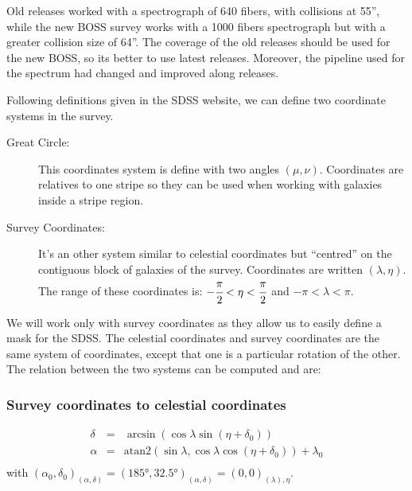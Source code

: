 Old releases worked with a spectrograph of 640 fibers, with collisions at
55'', while the new BOSS survey works with a 1000 fibers spectrograph but
with a greater collision size of 64''. The coverage of the old releases
should be used for the new BOSS, so its better to use latest releases.
Moreover, the pipeline used for the spectrum had changed and improved along
releases.

Following definitions given in the SDSS website, we can define two
coordinate systems in the survey.
%
\begin{description}
    \item[Great Circle:] This coordinates system is define with two angles
        $(\mu, \nu)$. Coordinates are relatives to one stripe so they can be
        used when working with galaxies inside a stripe region.

    \item[Survey Coordinates:] It's an other system similar to celestial
        coordinates but ``centred'' on the contiguous block of galaxies  of
        the survey. Coordinates are written $(\lambda, \eta)$. The range of
        these coordinates is: $-\cfrac{\pi}{2}<\eta<\cfrac{\pi}{2}$ and
        $-\pi<\lambda<\pi$.
\end{description}
%
We will work only with survey coordinates as they allow us to easily define
a mask for the SDSS\@. The celestial coordinates and survey coordinates are
the same system of coordinates, except that one is a particular rotation of
the other. The relation between the two systems can be computed and are:
%
\subsubsection{Survey coordinates to celestial coordinates}
%
\begin{eqnarray}
    \delta &=& \arcsin\left(\cos\lambda\sin\left(\eta+\delta_0\right)\right)\nonumber\\
    \alpha &=&
    \mathrm{atan2}\left(\sin\lambda,\cos\lambda\cos\left(\eta+\delta_0\right)\right)+\lambda_0\nonumber\\
\end{eqnarray}
%
with
${(\alpha_0,\delta_0)}_{(\alpha,\delta)}={(185°,32.5°)}_{(\alpha,\delta)}={(0,0)}_{(\lambda),
\eta}$.
%
